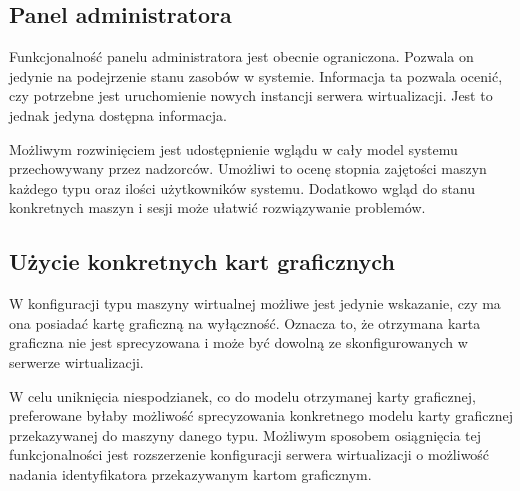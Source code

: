 \documentclass[../podsumowanie.tex]{subfiles}
\begin{document}
\subsection{Panel administratora}

Funkcjonalność panelu administratora jest obecnie ograniczona. Pozwala on jedynie na podejrzenie stanu zasobów w systemie. Informacja ta pozwala ocenić, czy potrzebne jest uruchomienie nowych instancji serwera wirtualizacji. Jest to jednak jedyna dostępna informacja.

Możliwym rozwinięciem jest udostępnienie wglądu w cały model systemu przechowywany przez nadzorców. Umożliwi to ocenę stopnia zajętości maszyn każdego typu oraz ilości użytkowników systemu. Dodatkowo wgląd do stanu konkretnych maszyn i sesji może ułatwić rozwiązywanie problemów.

\subsection{Użycie konkretnych kart graficznych}

W konfiguracji typu maszyny wirtualnej możliwe jest jedynie wskazanie, czy ma ona posiadać kartę graficzną na wyłączność. Oznacza to, że otrzymana karta graficzna nie jest sprecyzowana i może być dowolną ze skonfigurowanych w serwerze wirtualizacji.

W celu uniknięcia niespodzianek, co do modelu otrzymanej karty graficznej, preferowane byłaby możliwość sprecyzowania konkretnego modelu karty graficznej przekazywanej do maszyny danego typu. Możliwym sposobem osiągnięcia tej funkcjonalności jest rozszerzenie konfiguracji serwera wirtualizacji o możliwość nadania identyfikatora przekazywanym kartom graficznym.
\end{document}

